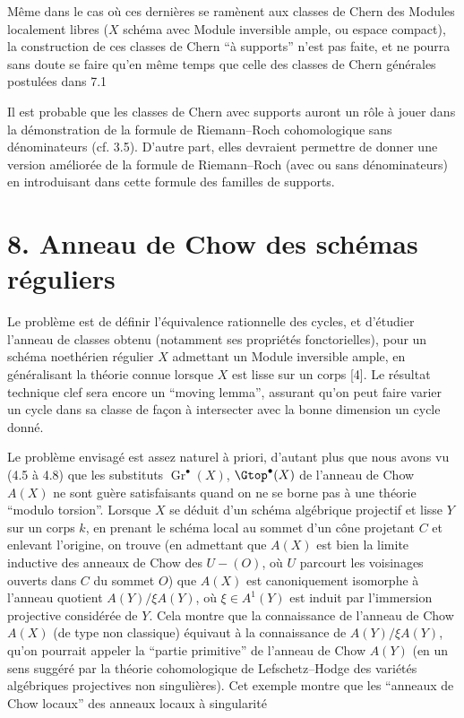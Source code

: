 
Même
dans le cas où ces dernières se ramènent aux classes de Chern des Modules localement libres ($X$ schéma avec Module inversible ample, ou espace compact), la construction de ces classes de Chern ``à supports'' n'est pas faite, et ne pourra sans doute se faire qu'en même temps que celle des classes de Chern générales postulées dans 7.1

Il est probable que les classes de Chern avec supports auront un rôle à jouer dans la démonstration de la formule de Riemann--Roch cohomologique sans dénominateurs (cf. 3.5). D'autre part, elles devraient permettre de donner une version améliorée de la formule de Riemann--Roch (avec ou sans dénominateurs) en introduisant dans cette formule des familles de supports.

\section*{8. Anneau de Chow des schémas réguliers}

Le problème est de définir l'équivalence rationnelle des cycles, et d'étudier l'anneau de classes obtenu (notamment ses propriétés fonctorielles), pour un schéma noethérien régulier $X$ admettant un Module inversible ample, en généralisant la théorie connue lorsque $X$ est lisse sur un corps [4]. Le résultat technique clef sera encore un ``moving lemma'', assurant qu'on peut faire varier un cycle dans sa classe de façon à intersecter avec la bonne dimension un cycle donné.

Le problème envisagé est assez naturel à priori, d'autant plus que nous avons vu (4.5 à 4.8) que les substituts $\operatorname{Gr}^\bullet(X)$, $\Gtop^\bullet(X)$ de l'anneau de Chow $A(X)$ ne sont guère satisfaisants quand on ne se borne pas à une théorie ``modulo torsion''. Lorsque $X$ se déduit d'un schéma algébrique projectif et lisse $Y$ sur un corps $k$, en prenant le schéma local au sommet d'un cône projetant $C$ et enlevant l'origine, on trouve (en admettant que $A(X)$ est bien la limite inductive des anneaux de Chow des $U-(O)$, où $U$ parcourt les voisinages ouverts dans $C$ du sommet $O$) que $A(X)$ est canoniquement isomorphe à l'anneau quotient $A(Y)/\xi A(Y)$, où $\xi\in A^1(Y)$ est induit par l'immersion projective considérée de $Y$. Cela montre que la connaissance de l'anneau de Chow $A(X)$ (de type non classique) équivaut à la connaissance de $A(Y)/\xi A(Y)$, qu'on pourrait appeler la ``partie primitive'' de l'anneau de Chow $A(Y)$ (en un sens suggéré par la théorie cohomologique de Lefschetz--Hodge des variétés algébriques projectives non singulières). Cet exemple montre que les ``anneaux de Chow locaux'' des anneaux locaux à singularité
